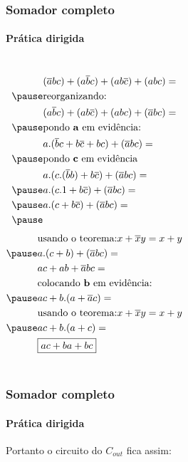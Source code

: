 \begin{frame}
	\frametitle{Somador completo}
	\framesubtitle{\textbf{Prática dirigida}}
	\begin{columns}
			\begin{equation}
				\begin{aligned}
					&(\overline{a}bc)+(a\overline{b}c)+(ab\overline{c})+(abc) = \\ \pause
					&\text{reorganizando:} \\
					&(a\overline{b}c)+(ab\overline{c})+(abc)+(\overline{a}bc) = \\ \pause
					&\text{pondo \textbf{a} em evidência:} \\
					&a.(\overline{b}c+b\overline{c}+bc)+(\overline{a}bc) = \\ \pause
					&\text{pondo \textbf{c} em evidência} \\
					&a.(c.(\overline{b}b)+b\overline{c})+(\overline{a}bc) = \\ \pause
					&a.(c.1+b\overline{c})+(\overline{a}bc) = \\ \pause
					&a.(c+b\overline{c})+(\overline{a}bc) = \\ \pause
				\end{aligned}
			\end{equation}
			\begin{equation}
				\begin{aligned}
					&\text{usando o teorema:} x+\overline{x}y = x+y \\ \pause
					&a.(c+b)+(\overline{a}bc) = \\
					&ac+ab+\overline{a}bc = \\ 
					&\text{colocando \textbf{b} em evidência:} \\ \pause
					&ac+b.(a+\overline{a}c) = \\
					&\text{usando o teorema:} x+\overline{x}y = x+y \\ \pause
					&ac+b.(a+c) = \\
					&\boxed{ac+ba+bc}
				\end{aligned}
			\end{equation}
	\end{columns}
\end{frame}

\begin{frame}
	\frametitle{Somador completo}
	\framesubtitle{\textbf{Prática dirigida}}
	\par Portanto o circuito do $C_{out}$ fica assim:
	\begin{figure}
		\centering
		
		\label{fig:somadorcompletoparte02}
	\end{figure}
\end{frame}

